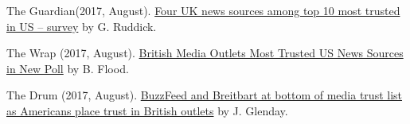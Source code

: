 \begin{bibenum}
    \item[] The Guardian(2017, August).
      \href{https://www.theguardian.com/media/2017/aug/09/four-uk-news-sources-among-top-10-most-trusted-in-us-survey}{Four UK news sources among top 10 most trusted in US – survey} by G. Ruddick.
    \item[] The Wrap (2017, August).
      \href{https://www.thewrap.com/british-media-outlets-most-trusted-us-news-sources-in-new-poll/}{British Media Outlets Most Trusted US News Sources in New Poll} by B. Flood.
    \item[] The Drum (2017, August).
      \href{http://www.thedrum.com/news/2017/08/08/buzzfeed-and-breitbart-bottom-media-trust-list-americans-place-trust-british-outlets}{BuzzFeed and Breitbart at bottom of media trust list as Americans place trust in British outlets} by J. Glenday.
  \end{bibenum}

